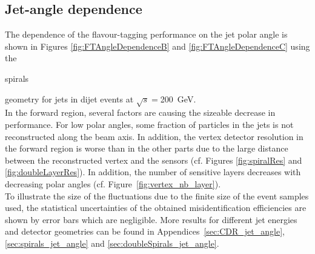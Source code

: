 \subsection{Jet-angle dependence}
The dependence of the flavour-tagging performance on the jet polar angle is shown in Figures \ref{fig:FTAngleDependenceB} and \ref{fig:FTAngleDependenceC} using the \begin{it}spirals\end{it} geometry for jets in dijet events at $\sqrt{s}=$200~GeV. \\
In the forward region, several factors are causing the sizeable decrease in performance. For low polar angles, some fraction of particles in the jets is not reconstructed along the beam axis. In addition, the vertex detector resolution in
the forward region is worse than in the other parts due to the large
distance between the reconstructed vertex and the sensors (cf. Figures
\ref{fig:spiralRes} and \ref{fig:doubleLayerRes}). In addition, the number of
sensitive layers decreases with decreasing polar angles (cf. Figure~\ref{fig:vertex_nb_layer}). \\
To illustrate the size of the fluctuations due to the finite size of the event samples used, the statistical uncertainties of the obtained misidentification efficiencies are shown by error bars which are negligible.
More results for different jet energies and detector geometries can be found in Appendices~\ref{sec:CDR_jet_angle}, \ref{sec:spirals_jet_angle} and \ref{sec:doubleSpirals_jet_angle}.
